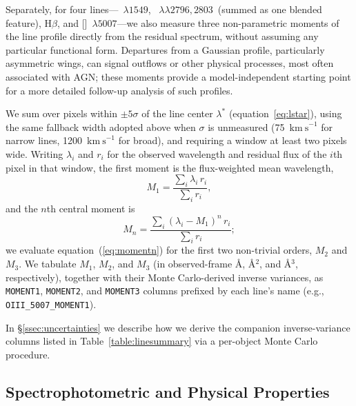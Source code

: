 \documentclass[modern,linenumbers]{aastex701}
\newcommand{\kms}{\ensuremath{\mathrm{km~s}^{-1}}}
\newcommand{\hb}{H\ensuremath{\beta}}
\newcommand{\oiiilam}{[\ion{O}{3}]~$\lambda5007$}
\newcommand{\mgiidoublet}{\ion{Mg}{2}~$\lambda\lambda2796,2803$}
\begin{document}
Separately, for four lines—~$\lambda1549$, \mgiidoublet\ (summed
as one blended feature), \hb, and \oiiilam—we also measure three
non-parametric moments of the line profile directly from the residual
spectrum, without assuming any particular functional form. Departures
from a Gaussian profile, particularly asymmetric wings, can signal
outflows or other physical processes, most often associated with AGN;
these moments provide a model-independent starting point for a more
detailed follow-up analysis of such profiles.

We sum over pixels within $\pm5\sigma$ of the line center $\lambda^*$
(equation~\ref{eq:lstar}), using the same fallback width adopted above
when $\sigma$ is unmeasured (75~\kms{} for narrow lines, 1200~\kms{} for
broad), and requiring a window at least two pixels wide. Writing
$\lambda_i$ and $r_i$ for the observed wavelength and residual flux of
the $i$th pixel in that window, the first moment is the flux-weighted
mean wavelength,
\begin{equation}
  M_1 = \frac{\sum_i \lambda_i\,r_i}{\sum_i r_i},
  \label{eq:moment1}
\end{equation}
and the $n$th central moment is
\begin{equation}
  M_n = \frac{\sum_i (\lambda_i-M_1)^n\,r_i}{\sum_i r_i};
  \label{eq:momentn}
\end{equation}
we evaluate equation~(\ref{eq:momentn}) for the first two non-trivial
orders, $M_2$ and $M_3$. We tabulate $M_1$, $M_2$, and $M_3$ (in
observed-frame \AA, \AA$^2$, and
\AA$^3$, respectively), together with their Monte Carlo-derived inverse
variances, as \texttt{MOMENT1}, \texttt{MOMENT2}, and \texttt{MOMENT3}
columns prefixed by each line's name (e.g., \texttt{OIII\_5007\_MOMENT1}).

In \S\ref{ssec:uncertainties} we describe how we derive
the companion inverse-variance columns listed in
Table~\ref{table:linesummary} via a per-object Monte Carlo procedure.



\subsection{Spectrophotometric and Physical Properties}
\label{ssec:quantities}

\end{document}
